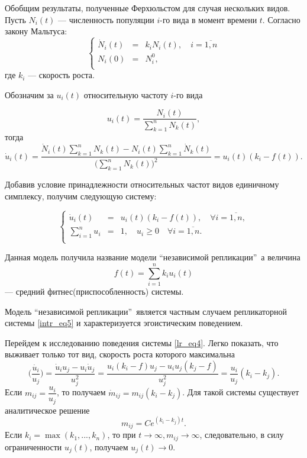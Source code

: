 Обобщим результаты, полученные Ферхюльстом для случая нескольких видов. Пусть $N_{i}(t)$ --- численность популяции $i$-го вида в момент времени $t$. Согласно закону Мальтуса:
$$
\left\{
\begin{array}{rcl}
\dot{N}_{i}(t) &=& k_{i}N_{i}(t), \quad i = \overline{1, n}\\
N_{i}(0) &=& N_{i}^{0},\\
\end{array}
\right.
$$
где $k_{i}$ --- скорость роста.

Обозначим за $u_{i}(t)$ относительную частоту $i$-го вида

\begin{equation}
u_{i}(t) = \frac{N_{i}(t)}{\sum\limits_{k = 1}^{n}N_{k}(t)},
\label{lr_eq3}
\end{equation}
тогда
$$
\dot{u}_{i}(t) = \frac{\dot{N}_{i}(t)\sum\limits_{k = 1}^{n}N_{k}(t) - N_{i}(t)\sum\limits_{k = 1}^{n}\dot{N}_{k}(t)}{\Big(\sum\limits_{k = 1}^{n}N_{k}(t)\Big)^{2}} = u_{i}(t)(k_{i} - f(t)).
$$

Добавив условие принадлежности относительных частот видов единичному симплексу, получим следующую систему:

\begin{equation}
\left\{
\begin{array}{rcl}
\dot{u}_{i}(t) &=& u_{i}(t)(k_{i} - f(t)), \quad \forall i = \overline{1, n},\\
\sum\limits_{i = 1}^{n} u_{i} &=& 1, \quad u_{i} \ge 0 \quad \forall i = \overline{1, n}.\\
\end{array}
\right.
\label{lr_eq4}
\end{equation}

Данная модель получила название модели ``независимой репликации''\, а величина  
$$
f(t) = \sum\limits_{i = 1}^{n}k_{i}u_{i}(t)
$$ 
--- средний фитнес(приспособленность) системы.

Модель ``независимой репликации''\, является частным случаем репликаторной системы \eqref{intr_eq5} и характеризуется эгоистическим поведением.

Перейдем к исследованию поведения системы \eqref{lr_eq4}. Легко показать, что выживает только тот вид, скорость роста которого максимальна
$$
\dot{\Bigg(\frac{u_{i}}{u_{j}}\Bigg)} = \frac{\dot{u}_{i}u_{j} - u_{i}\dot{u}_{j}}{u_{j}^{2}} = \frac{u_{i}(k_{i} - f)u_{j} - u_{i}u_{j}(k_{j} - f)}{u_{j}^{2}} = \frac{u_{i}}{u_{j}}(k_{i} - k_{j}).
$$
Если $m_{ij} = \dfrac{u_{i}}{u_{j}}$, то получаем $\dot{m}_{ij} = m_{ij}(k_{i} - k_{j})$. Для такой системы существует аналитическое решение
$$
m_{ij} = Ce^{(k_{i} - k_{j})t}.
$$ 
Если $k_{i} = \max(k_{1}, ..., k_{n})$, то при $t \to \infty, m_{ij} \to \infty$, следовательно, в силу ограниченности $u_{j}(t)$, получаем $u_{j}(t) \to 0$.

